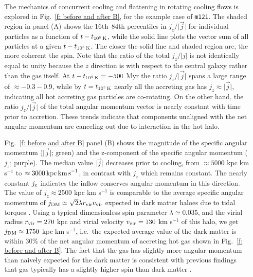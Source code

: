 \documentclass[fleqn,usenatbib]{mnras}
\newcommand{\tcools}{t_{10^5\,{\rm K}}}
\newcommand{\Rvir}{r_{\rm vir}}
\newcommand{\vvir}{v_{\rm vir}}
\begin{document}
The mechanics of concurrent cooling and flattening in rotating cooling flows is explored in Fig.~\ref{f: before and after B}, for the example case of \texttt{m12i}.
The shaded region in panel (A) shows the 16th--84th percentiles in $j_z/\vert\vec j\vert$ for individual particles as a function of $t-\tcools$, while the solid line plots the vector sum of all particles at a given $t-\tcools$.
The closer the solid line and shaded region are, the more coherent the spin.
Note that the ratio of the total $j_z/\vert j \vert$ is not identically equal to unity because the $z$ direction is with respect to the central galaxy rather than the gas itself.
At $t-\tcools=-500$ Myr the ratio $j_z/\vert\vec j\vert$ spans a large range of $\approx -0.3 - 0.9$, while by $t=\tcools$ nearly all the accreting gas has $j_z\approx\vert\vec j\vert$, indicating all hot accreting gas particles are co-rotating.
On the other hand, the ratio $j_z/\vert\vec j\vert$ of the total angular momentum vector is nearly constant with time prior to accretion. 
These trends indicate that components unaligned with the net angular momentum are canceling out due to interaction in the hot halo.

Fig.~\ref{f: before and after B} panel (B) shows the magnitude of the specific angular momentum ($\vert \vec j \vert$; green) and the z-component of the specific angular momentum ($j_z$; purple).
The median value $\vert \vec j \vert$ decreases prior to cooling, from $\approx 5000$ kpc km s$^{-1}$ to $\approx 3000\,{\rm kpc\,km\,s}^{-1}$, in contrast with  $j_z$ which remains constant.
The nearly constant $j_{\rm z}$ indicates the inflow conserves angular momentum in this direction. 
The value of $j_z\approx 2500$ kpc km s$^{-1}$ is comparable to the average specific angular momentum of $j_{\rm DM} \simeq \sqrt{2}\lambda \Rvir \vvir$ expected in dark matter haloes due to tidal torques \citep[e.g.][]{Bullock2001}.
Using a typical dimensionless spin parameter $\lambda \simeq 0.035$, and the virial radius $\Rvir=270$ kpc and virial velocity $\vvir=130$ km s$^{-1}$ of this halo, we get $j_{\rm DM}\approx1750$ kpc km s$^{-1}$, i.e.~the expected average value of the dark matter is within $30\%$ of the net angular momentum of accreting hot gas shown in Fig.~\ref{f: before and after B}. The fact that the gas has slightly more angular momentum than naively expected for the dark matter is consistent with previous findings that gas typically has a slightly higher spin than dark matter \citep[e.g.][]{Stewart2017}.
\end{document}
